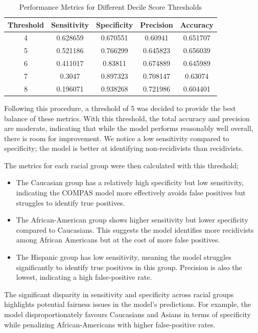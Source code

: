 \begin{table}[h!]
	\centering
	\begin{tabular}{|c|c|c|c|c|}
		\hline
		\textbf{Threshold} & \textbf{Sensitivity} & \textbf{Specificity} & \textbf{Precision} & \textbf{Accuracy} \\ \hline
		4                               & 0.628659             & 0.670551             & 0.60941            & 0.651707          \\ \hline
		5                               & 0.521186             & 0.766299             & 0.645823           & 0.656039          \\ \hline
		6                               & 0.411017             & 0.83811              & 0.674889           & 0.645989          \\ \hline
		7                               & 0.3047               & 0.897323             & 0.708147           & 0.63074           \\ \hline
		8                               & 0.196071             & 0.938268             & 0.721986           & 0.604401          \\ \hline
	\end{tabular}
	\caption{Performance Metrics for Different Decile Score Thresholds}
	\label{tab:performance_metrics}
\end{table}

Following this procedure, a threshold of 5 was decided to provide the best balance of these metrics. With this threshold, the total accuracy and precision are moderate, indicating that while the model performs reasonably well overall, there is room for improvement. We notice a low sensitivity compared to specificity; the model is better at identifying non-recidivists than recidivists.


The metrics for each racial group were then calculated with this threshold; 

\begin{itemize}
	\item The Caucasian group has a relatively high specificity but low sensitivity, indicating the COMPAS model more effectively avoids false positives but struggles to identify true positives. 

	\item The African-American group shows higher sensitivity but lower specificity compared to Caucasians. This suggests the model identifies more recidivists among African Americans but at the cost of more false positives.


	\item The Hispanic group has low sensitivity, meaning the model struggles significantly to identify true positives in this group. Precision is also the lowest, indicating a high false-positive rate.
\end{itemize}

The significant disparity in sensitivity and specificity across racial groups highlights potential fairness issues in the model's predictions. For example, the model disproportionately favours Caucasians and Asians in terms of specificity while penalizing African-Americans with higher false-positive rates.



